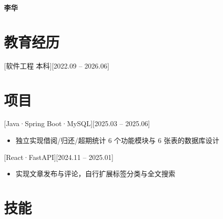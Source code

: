 \documentclass{resume}
\newcommand{\heiti}{\CJKfamily{hei}\bfseries}
\begin{document}
\begin{center}
  {\heiti 李华}
\end{center}
\vspace{-1.0em}
\begin{center}
\end{center}
\vspace{0.5em}

\section{教育经历}
[\textnormal{软件工程\textbar} 本科][2022.09 -- 2026.06]

\section{项目}
[Java·Spring Boot·MySQL][2025.03 -- 2025.06]
\begin{itemize}
  \item 独立实现借阅/归还/超期统计 6 个功能模块与 6 张表的数据库设计
\end{itemize}

[React·FastAPI][2024.11 -- 2025.01]
\begin{itemize}
  \item 实现文章发布与评论，自行扩展标签分类与全文搜索
\end{itemize}

\section{技能}
\end{document}
